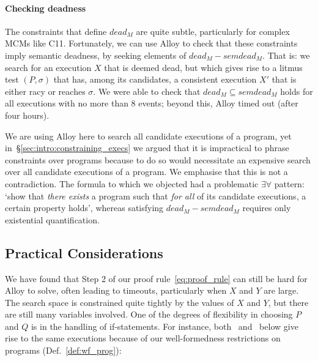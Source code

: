 \paragraph{Checking deadness} 
The constraints that define $dead_M$ are quite subtle, particularly
for complex MCMs like C11. Fortunately, we can use Alloy to check that
these constraints imply semantic deadness, by seeking elements of
$dead_M - semdead_M$. That is: we search for an execution $X$ that is
deemed dead, but which gives rise to a litmus test $(P,\sigma)$ that
has, among its candidates, a consistent execution $X'$ that is either
racy or reaches $\sigma$. We were able to check that
$dead_M \subseteq semdead_M$ holds for all executions with no
more than 8 events; beyond this, Alloy timed out (after four hours).

\begin{remark} We are using Alloy here to search all candidate
executions of a program, yet in~\S\ref{sec:intro:constraining_execs}
we argued that it is impractical to phrase constraints over programs
because to do so would necessitate an expensive search over all
candidate executions of a program. We emphasise that this is not a
contradiction. The formula to which we objected had a problematic
$\exists\forall$ pattern: `show that \emph{there exists} a program
such that \emph{for all} of its candidate executions, a certain
property holds', whereas satisfying $dead_M - semdead_M$ requires only
existential quantification. \end{remark}

\subsection{Practical Considerations}
\label{sec:practical}

We have found that Step 2 of our proof rule~\eqref{eq:proof_rule} can
still be hard for Alloy to solve, often leading to timeouts,
particularly when $X$ and $Y$ are large. The search space is
constrained quite tightly by the values of $X$ and $Y$, but there are
still many variables involved. One of the degrees of flexibility in
choosing $P$ and $Q$ is in the handling of if-statements. For
instance, both~ and~ below
give rise to the same executions because of our well-formedness
restrictions on programs (Def.~\ref{def:wf_prog}):
%

